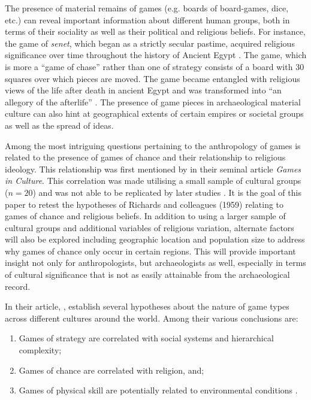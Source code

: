 The presence of material remains of games (e.g. boards of board-games, dice, etc.) can reveal important information about different human groups, both in terms of their sociality as well as their political and religious beliefs. For instance, the game of \textit{senet}, which began as a strictly secular pastime, acquired religious significance over time throughout the history of Ancient Egypt \parencite{piccione1980}. 
The game, which is more a \enquote{game of chase} rather than one of strategy \parencite{faulkner2008} consists of a board with 30 squares over which pieces are moved. The game became entangled with religious views of the life after death in ancient Egypt \parencite{piccione1980} and was transformed into \enquote{an allegory of the afterlife} \parencite[158]{faulkner2008}. The presence of game pieces in archaeological material culture can also hint at geographical extents of certain empires or societal groups \parencite[1717]{devoogt2013} as well as the spread of ideas.

Among the most intriguing questions pertaining to the anthropology of games is related to the presence of games of chance and their relationship to religious ideology. This relationship was first mentioned by \textcite{roberts1959} in their seminal article \textit{Games in Culture}. This correlation was made utilising a small sample of cultural groups ($n = 20$) and was not able to be replicated by later studies \parencite[e.g.][]{chick1998}. It is the goal of this paper to retest the hypotheses of Richards and colleagues (1959) relating to games of chance and religious beliefs. In addition to using a larger sample of cultural groups and additional variables of religious variation, alternate factors will also be explored including geographic location and population size to address why games of chance only occur in certain regions. This will provide important insight not only for anthropologists, but archaeologists as well, especially in terms of cultural significance that is not as easily attainable from the archaeological record.


In their article, \emph{}, \citeauthor{roberts1959}  establish several hypotheses about the nature of game types across different cultures around the world. Among their various conclusions are:

\begin{enumerate}
\item Games of strategy are correlated with social systems and hierarchical complexity;
\item Games of chance are correlated with religion, and;
\item Games of physical skill are potentially related to environmental conditions \parencite[604]{roberts1959}.
\end{enumerate}

